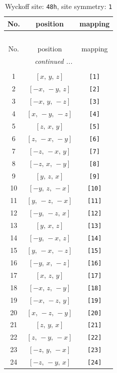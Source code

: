 \documentclass[fleqn,8pt]{jsarticle}
\begin{document}
\begin{longtable}{ccc}
\caption{Wyckoff site: {\tt 48h}, site symmetry: {\tt 1}}
 \\
 \hline \hline
No. & position & mapping \\ \hline \endfirsthead

\multicolumn{2}{l}{\tablename\ \thetable{}} \\
 \hline \hline
No. & position & mapping \\ \hline \endhead

 \hline \hline
\multicolumn{2}{r}{\footnotesize\it continued ...} \\ \endfoot

 \hline \hline
\multicolumn{2}{r}{} \\ \endlastfoot

1 & $\left[ x,\, y,\, z \right]$ & {\tt [1]} \\ \hline
2 & $\left[ - x,\, - y,\, z \right]$ & {\tt [2]} \\ \hline
3 & $\left[ - x,\, y,\, - z \right]$ & {\tt [3]} \\ \hline
4 & $\left[ x,\, - y,\, - z \right]$ & {\tt [4]} \\ \hline
5 & $\left[ z,\, x,\, y \right]$ & {\tt [5]} \\ \hline
6 & $\left[ z,\, - x,\, - y \right]$ & {\tt [6]} \\ \hline
7 & $\left[ - z,\, - x,\, y \right]$ & {\tt [7]} \\ \hline
8 & $\left[ - z,\, x,\, - y \right]$ & {\tt [8]} \\ \hline
9 & $\left[ y,\, z,\, x \right]$ & {\tt [9]} \\ \hline
10 & $\left[ - y,\, z,\, - x \right]$ & {\tt [10]} \\ \hline
11 & $\left[ y,\, - z,\, - x \right]$ & {\tt [11]} \\ \hline
12 & $\left[ - y,\, - z,\, x \right]$ & {\tt [12]} \\ \hline
13 & $\left[ y,\, x,\, z \right]$ & {\tt [13]} \\ \hline
14 & $\left[ - y,\, - x,\, z \right]$ & {\tt [14]} \\ \hline
15 & $\left[ y,\, - x,\, - z \right]$ & {\tt [15]} \\ \hline
16 & $\left[ - y,\, x,\, - z \right]$ & {\tt [16]} \\ \hline
17 & $\left[ x,\, z,\, y \right]$ & {\tt [17]} \\ \hline
18 & $\left[ - x,\, z,\, - y \right]$ & {\tt [18]} \\ \hline
19 & $\left[ - x,\, - z,\, y \right]$ & {\tt [19]} \\ \hline
20 & $\left[ x,\, - z,\, - y \right]$ & {\tt [20]} \\ \hline
21 & $\left[ z,\, y,\, x \right]$ & {\tt [21]} \\ \hline
22 & $\left[ z,\, - y,\, - x \right]$ & {\tt [22]} \\ \hline
23 & $\left[ - z,\, y,\, - x \right]$ & {\tt [23]} \\ \hline
24 & $\left[ - z,\, - y,\, x \right]$ & {\tt [24]} \\
\end{longtable}
\end{document}
